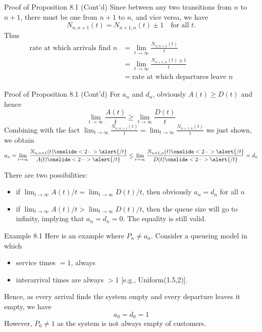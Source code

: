 \documentclass[letterpaper]{beamer}
\def\hid#1#2{\onslide<#1>{\alert{#2}}}
\begin{document}
\begin{frame}{Proof of Proposition 8.1 (Cont'd)}
Since between any two transitions from $n$ to $n+1$, there must be one from
$n + 1$ to $n$, and vice versa, we have
$$N_{n,n+1}(t)=N_{n+1,n}(t)\pm 1\quad \mbox{for all }t.$$
Thus
\begin{align*}
\mbox{rate at which arrivals find }n
&= \lim_{t\to\infty}\frac{N_{n,n+1}(t)}{t}\\
&= \lim_{t\to\infty}\frac{N_{n+1,n}(t)\pm 1}{t}\\
&=\mbox{rate at which departures leave }n
\end{align*}
\end{frame}
\begin{frame}{Proof of Proposition 8.1 (Cont'd)}
For $a_n$ and $d_n$, obviously $A(t)\ge D(t)$ and hence
\[
\lim_{t\to\infty}\frac{A(t)}{t}\ge\lim_{t\to\infty}\frac{D(t)}{t}
\]
Combining with the fact $\lim_{t\to\infty}\frac{N_{n,n+1}(t)}{t}
= \lim_{t\to\infty}\frac{N_{n+1,n}(t)}{t}$ we just shown, we obtain
\[
a_n%
=\lim_{t\to\infty}\frac{N_{n,n+1}(t)\hid{2-}{/t}}{A(t)\hid{2-}{/t}}
\le
\lim_{t\to\infty}\frac{N_{n+1,n}(t)\hid{2-}{/t}}{D(t)\hid{2-}{/t}}=d_n
\]

There are two possibilities:
\begin{itemize}
\item if $\displaystyle\lim_{t\to\infty}A(t)/t=\lim_{t\to\infty}D(t)/t$, then obviously $a_n=d_n$ for all $n$
\item if $\displaystyle\lim_{t\to\infty}A(t)/t>\lim_{t\to\infty}D(t)/t$, then the queue size will go to infinity, implying that
$a_n = d_n = 0.$ The equality is still valid.
\end{itemize}
\end{frame}
\begin{frame}{Example 8.1}
Here is an example where $P_n\neq a_n$. Consider a queueing model in which
\begin{itemize}
\item service times $= 1$, always
\item interarrival times  are always $> 1$ [e.g., Uniform(1.5,2)].
\end{itemize}
Hence, as every arrival finds the system empty and every departure leaves it empty, we have
$$a_0 = d_0 = 1$$
However,
$P_0 \neq 1$
as the system is not always empty of customers.\bigskip


\end{frame}
\end{document}
